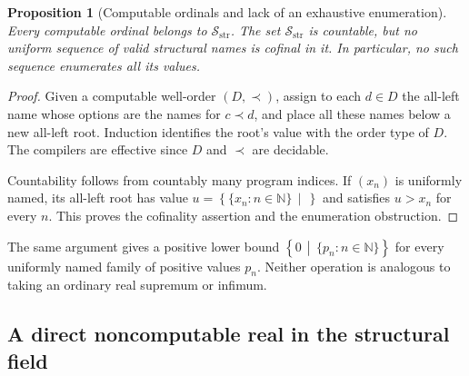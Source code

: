 \documentclass[11pt,letterpaper]{article}
\numberwithin{equation}{section}
\newtheorem{proposition}[theorem]{Proposition}
\theoremstyle{definition}
\theoremstyle{remark}
\newcommand{\Sc}{\mathcal S_{\mathrm{str}}}
\newcommand{\N}{\mathbb N}
\newcommand{\cut}[2]{\left\{#1\,\middle|\,#2\right\}}
\begin{document}
\begin{proposition}[Computable ordinals and lack of an exhaustive enumeration]
\label{prop:structcount}
Every computable ordinal belongs to $\Sc$. The set $\Sc$ is countable,
but no uniform sequence of valid structural names is cofinal in it. In
particular, no such sequence enumerates all its values.
\end{proposition}
\begin{proof}
Given a computable well-order $(D,\prec)$, assign to each $d\in D$ the
all-left name whose options are the names for $c\prec d$, and place all
these names below a new all-left root. Induction identifies the root's value
with the order type of $D$. The compilers are effective since $D$ and
$\prec$ are decidable.

Countability follows from countably many program indices. If $(x_n)$ is
uniformly named, its all-left root has value $u=\cut{\{x_n:n\in\N\}}{}$
and satisfies $u>x_n$ for every $n$. This proves the cofinality assertion
and the enumeration obstruction.
\end{proof}

The same argument gives a positive lower bound $\cut0{\{p_n:n\in\N\}}$
for every uniformly named family of positive values $p_n$. Neither operation
is analogous to taking an ordinary real supremum or infimum.

\subsection{A direct noncomputable real in the structural field}
\end{document}
